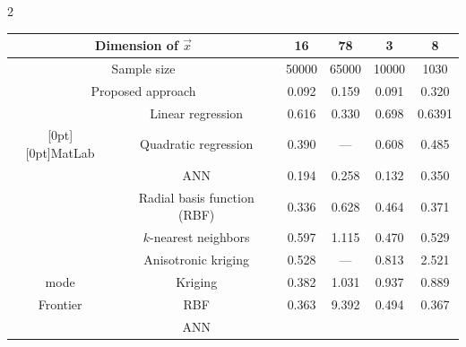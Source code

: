 \begin{multicols}{2}
\begin{table}[b]
\begin{center}
\begin{tabular}{cccccc}
      \hline

      \multicolumn{2}{c}{Dimension of $\vec x$}   &16 &78 &3  &8\\ 

      \hline

      \multicolumn{2}{c}{Sample size} &50000  &65000  &10000  &1030\\ \hline

              \multicolumn{2}{c}{Proposed approach}

              &{0.092}  &{0.159}    &{0.091} & 0.320\\ 

              \hline

      & Linear regression & 0.616   &0.330      &0.698  &  \hphantom{9}0.6391\\ 


  \multicolumn{1}{c}{\raisebox{-6pt}[0pt][0pt]{MatLab}}     & Quadratic regression

                &0.390      &---      &0.608& 0.485  \\ 


      &ANN      &0.194  &0.258      & 0.132     & 0.350  \\ 


      &Radial basis function (RBF)  &0.336  &0.628      &0.464&     0.371   \\ 

      \hline

      &$k$-nearest neighbors     &0.597      &1.115      &0.470& 0.529   \\ 


      &Anisotronic kriging

        &0.528  & --- & 0.813& 2.521  \\ 


  mode    &Kriging      &0.382 &1.031   &0.937& 0.889  \\ 


Frontier     &RBF          &0.363&9.392        &0.494  &0.367  \\ 


      &ANN


\end{tabular}
\end{center}
\end{table}
\end{multicols}

